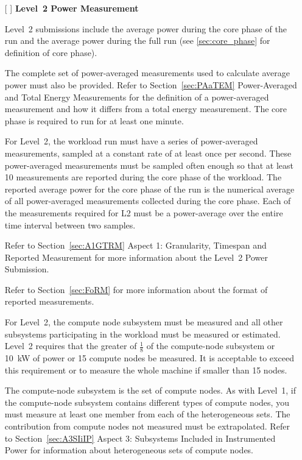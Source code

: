 \begin{itemize}
\newpage
\item[{[ ]}]
\textbf{Level~2 Power Measurement}

Level~2 submissions include the average power during the core phase of the run and the average power during the full run (see \ref{sec:core_phase} for definition of core phase).

The complete set of power-averaged measurements used to calculate average power must also be provided. 
Refer to Section~\ref{sec:PAaTEM} Power-Averaged and Total Energy Measurements for the definition of a power-averaged
measurement and how it differs from a total energy measurement.
The core phase is required to run for at least one minute.

For Level~2, the workload run must have a series of power-averaged measurements, sampled at a constant rate of at least once per second.
These power-averaged measurements must be sampled often enough so that at least 10 measurements are reported during the
core phase of the workload. The reported average power for the core phase of the run is the numerical average of
all power-averaged measurements collected during the core phase.
Each of the measurements required for L2 must be a power-average over the entire time interval between two samples. 


Refer to Section~\ref{sec:A1GTRM} Aspect 1: Granularity, Timespan and Reported Measurement for more information about the Level~2 Power Submission. 

Refer to Section~\ref{sec:FoRM} for more information about the format of reported measurements.

For Level~2, the compute node subsystem must be measured and all other subsystems participating in the workload must be measured or estimated. Level~2 requires that the 
greater of $ \frac{1}{8} $ of the compute-node subsystem or 10~kW of power or 15 compute nodes be measured. It is acceptable to exceed this requirement or to measure the whole machine if smaller than 15 nodes.

The compute-node subsystem is the set of compute nodes. As with Level~1, if the compute-node subsystem contains different types of compute nodes, you must measure at least one member from each of the heterogeneous sets. The contribution from compute nodes not measured must be extrapolated. Refer to Section~\ref{sec:A3SIiIP} Aspect 3: Subsystems Included in Instrumented Power for information about heterogeneous sets of compute nodes.


\end{itemize}
